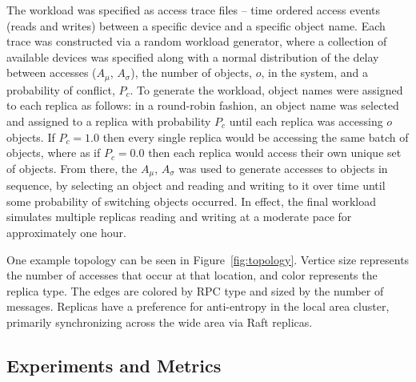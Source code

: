 \documentclass[10pt,conference,letterpaper]{IEEEtran}
\begin{document}
The workload was specified as access trace files -- time ordered access events (reads and
writes) between a specific device and a specific object name.
Each trace was constructed via a random workload generator, where a collection of
available devices was specified along with a normal distribution of the delay between
accesses ($A_{\mu}$, $A_{\sigma}$), the number of objects, $o$, in the system, and a
probability of conflict, $P_c$.
To generate the workload, object names were assigned to each replica as follows: in a
round-robin fashion, an object name was selected and assigned to a replica with
probability $P_c$ until each replica was accessing $o$ objects.
If $P_c = 1.0$ then every single replica would be accessing the same batch of objects,
where as if $P_c = 0.0$ then each replica would access their own unique set of objects.
From there, the $A_{\mu}$, $A_{\sigma}$ was used to generate accesses to objects in
sequence, by selecting an object and reading and writing to it over time until some
probability of switching objects occurred.
In effect, the final workload simulates multiple replicas reading and writing at a
moderate pace for approximately one hour.

One example topology can be seen in Figure~\ref{fig:topology}.
Vertice size represents the number of
accesses that occur at that location, and color represents the
replica type.
The edges are colored by RPC type and sized by the
number of messages.
Replicas have a preference for anti-entropy in the local
area cluster, primarily synchronizing across the wide area via Raft replicas.

\subsection{Experiments and Metrics}
\end{document}
